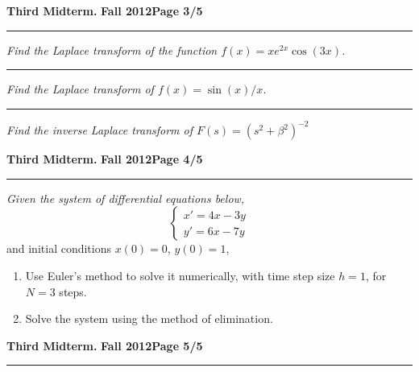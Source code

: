 \documentclass[12pt]{article}
\begin{document}
\newpage
\hfill{\large\bf Third Midterm.}\hfill{\large\bf
  Fall 2012}\hfill{\large\bf Page 3/5}\hrule

\bigskip
{\problem[10pts] \em Find the Laplace transform of the function
$f(x)=xe^{2x}\cos(3x)$.}
\vspace{4cm}
\begin{flushright}
\end{flushright}
\hrule
{\problem[10pts] \em Find the Laplace transform of $f(x)=\sin(x)/x.$}
\vspace{4cm}
\begin{flushright}
\end{flushright}
\hrule
{\problem[20pts] \em Find the inverse Laplace transform of
  $F(s)=(s^2+\beta^2)^{-2}$}
\vspace{8cm}
\begin{flushright}
\end{flushright}
\newpage

\hfill{\large\bf Third Midterm.}\hfill{\large\bf
  Fall 2012}\hfill{\large\bf Page 4/5}\hrule

\bigskip
{\problem[25pts] \em Given the system of differential equations below,}
\begin{equation*}
\begin{cases}
x'= 4x-3y\\ y'=6x-7y
\end{cases}
\end{equation*}
and initial conditions $x(0)=0$, $y(0)=1$,
\begin{enumerate}
\item Use Euler's method to solve it numerically, with time step size
$h=1$, for $N=3$ steps.
\item Solve the system using the method of elimination.  
\end{enumerate}
\newpage

\hfill{\large\bf Third Midterm.}\hfill{\large\bf
  Fall 2012}\hfill{\large\bf Page 5/5}\hrule
\end{document}
